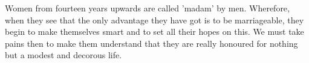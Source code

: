 Women from  fourteen years upwards are  called 'madam' by men.  Wherefore, when
they see  that the  only advantage they  have got is  to be  marriageable, they
begin to make themselves smart and to set all their hopes on this. We must take
pains then  to make them understand  that they are really  honoured for nothing
but a modest and decorous life.
